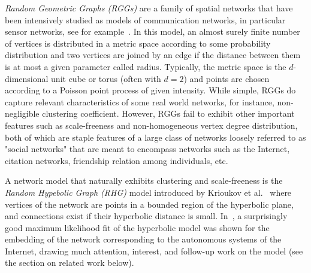 \emph{Random Geometric Graphs (RGGs)} are a family of spatial networks that have been intensively studied as models of communication networks, in particular sensor networks, see for example~\cite{Akyildiz}.
In this model, an almost surely finite number of vertices is distributed in a metric space according to some 
probability distribution and two vertices are joined by an edge if the distance between them is at most a given parameter called
radius.
Typically, the metric space is the $d$-dimensional unit cube or torus (often with $d=2$) and points are chosen according to a Poisson point process of given intensity. 
While simple, RGGs do capture relevant characteristics of some real world networks, for instance, non-negligible clustering coefficient.
However, RGGs fail to exhibit other important features such as scale-freeness and non-homogeneous vertex degree distribution, both of which are staple features
of a large class of networks loosely referred to as "social networks" that are meant to encompass networks such as the Internet, citation networks, friendship relation among individuals, etc. 

A network model that naturally exhibits clustering and scale-freeness is the \emph{Random Hypebolic Graph (RHG)} model introduced by Krioukov et al.~\cite{KPKVB10} where vertices of the network are points in a bounded region of the hyperbolic plane, and connections exist if their hyperbolic distance is small. In~\cite{BPK10}, a surprisingly good maximum likelihood fit of the hyperbolic model was shown for the embedding of the network corresponding to the autonomous systems of the Internet,
drawing much attention, interest, and follow-up work on the model (see the section on related work below). 


